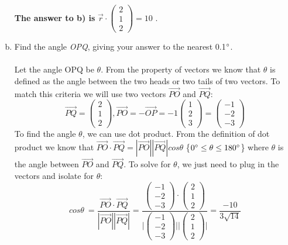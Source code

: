 \documentclass{article}
\begin{document}
\begin{enumerate}[a)]
\textbf{The answer to b) is} \(\vec{r} \cdot \begin{pmatrix}2 \\ 1  \\ 2  \end{pmatrix} = 10\) .
\item  Find the angle \textit{OPQ}, giving your answer to the nearest 0.1\(\degree\).
\\ \\
Let the angle OPQ  be \(\theta\). From the property of vectors we know that \(\theta\) is defined as the angle between the two heads or two tails of two vectors. To match this criteria we will use two vectors  \(\overrightarrow{PO}\) and \(\overrightarrow{PQ}\):
$$\overrightarrow{PQ} = \begin{pmatrix}2 \\ 1  \\ 2 \end{pmatrix}, \overrightarrow{PO} = -\overrightarrow{OP} = -1\begin{pmatrix}1 \\ 2  \\ 3  \end{pmatrix} = \begin{pmatrix}-1 \\ -2  \\ -3 \end{pmatrix}  $$To find the angle \(\theta\), we can use dot product. From the definition of dot product we know that \(\overrightarrow{PO} \cdot \overrightarrow{PQ} = |\overrightarrow{PO}||\overrightarrow{PQ}|cos\theta\) \{\(0\degree \leq \theta\leq 180\degree\)\} where \(\theta\) is the angle between  \(\overrightarrow{PO}\) and \(\overrightarrow{PQ}\). To solve for \(\theta\), we just need to plug in the vectors and isolate for \(\theta\):
$$cos\theta\ = \frac{\overrightarrow{PO} \cdot \overrightarrow{PQ}}{|\overrightarrow{PO}||\overrightarrow{PQ}|} = \frac{\begin{pmatrix}-1 \\ -2  \\ -3 \end{pmatrix} \cdot \begin{pmatrix}2 \\ 1  \\ 2 \end{pmatrix}}{\Bigg|\begin{pmatrix}-1 \\ -2  \\ -3 \end{pmatrix}\Bigg|\Bigg|\begin{pmatrix}2 \\ 1  \\ 2 \end{pmatrix}\Bigg|} = \frac{-10}{3\sqrt{14}}$$

\end{enumerate}
\end{document}
